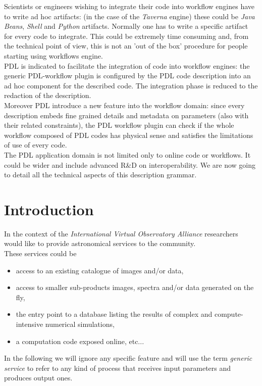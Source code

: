 \documentclass[a4paper,11pt] {ivoa}
\begin{document}
 Scientists or engineers wishing to integrate their code into workflow engines have to write ad hoc artifacts: (in the case of the {\it Taverna} engine) these could be {\it Java Beans}, {\it Shell} and {\it Python} artifacts. Normally one has to write a specific artifact for every code to integrate. This could be extremely time consuming and, from the technical point of view, this is not an 'out of the box' procedure for people starting using workflows engine.\\
PDL is indicated to facilitate the integration of code into workflow engines: the generic PDL-workflow plugin is configured by the PDL code description into an ad hoc component for the described code. The integration phase is reduced to the redaction of the description.\\ 
Moreover PDL introduce a new feature into the workflow domain: since every description embeds fine grained details and metadata on parameters (also with their related constraints), the PDL workflow plugin can check if the whole workflow composed of PDL codes has physical sense and satisfies the limitations of use of every code.\\

The PDL application domain is not limited only to online code or workflows. It could be wider and include advanced R\&D on interoperability. We are now going to detail all the technical aspects of this description grammar. 


\section{Introduction}
In the context of the {\it International Virtual Observatory Alliance} researchers would like to
provide astronomical services to the community. \\
These services could be 
\begin{itemize}
\item   access to an existing catalogue of images and/or data,
\item  access to smaller sub-products images, spectra and/or data generated on the fly,
\item  the entry point to a database listing the results of complex and compute-intensive numerical simulations,
\item a computation code exposed online, etc... 
\end{itemize}
In the following we will ignore any specific feature and will use the term {\it generic service} to
refer to any kind of process that receives input parameters and produces output ones.\\
\end{document}
